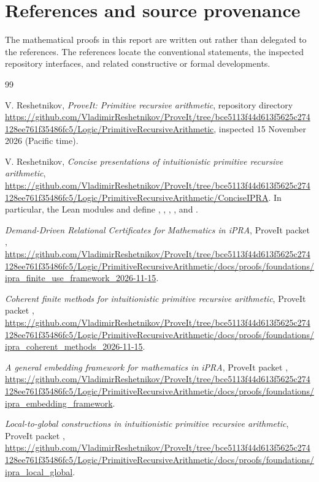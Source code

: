 \section{References and source provenance}

The mathematical proofs in this report are written out rather than delegated to the references.
The references locate the conventional statements, the inspected repository interfaces, and related
constructive or formal developments.

\begin{thebibliography}{99}

V. Reshetnikov,
\emph{ProveIt: Primitive recursive arithmetic},
repository directory \url{https://github.com/VladimirReshetnikov/ProveIt/tree/bce5113f44d613f5625c274128ee761f35486fc5/Logic/PrimitiveRecursiveArithmetic},
inspected 15 November 2026 (Pacific time).

V. Reshetnikov,
\emph{Concise presentations of intuitionistic primitive recursive arithmetic},
\url{https://github.com/VladimirReshetnikov/ProveIt/tree/bce5113f44d613f5625c274128ee761f35486fc5/Logic/PrimitiveRecursiveArithmetic/ConciseIPRA}.
In particular, the Lean modules  and  define
, , , , and .

\emph{Demand-Driven Relational Certificates for Mathematics in iPRA},
ProveIt packet ,
\url{https://github.com/VladimirReshetnikov/ProveIt/tree/bce5113f44d613f5625c274128ee761f35486fc5/Logic/PrimitiveRecursiveArithmetic/docs/proofs/foundations/ipra_finite_use_framework_2026-11-15}.

\emph{Coherent finite methods for intuitionistic primitive recursive arithmetic},
ProveIt packet ,
\url{https://github.com/VladimirReshetnikov/ProveIt/tree/bce5113f44d613f5625c274128ee761f35486fc5/Logic/PrimitiveRecursiveArithmetic/docs/proofs/foundations/ipra_coherent_methods_2026-11-15}.

\emph{A general embedding framework for mathematics in iPRA},
ProveIt packet ,
\url{https://github.com/VladimirReshetnikov/ProveIt/tree/bce5113f44d613f5625c274128ee761f35486fc5/Logic/PrimitiveRecursiveArithmetic/docs/proofs/foundations/ipra_embedding_framework}.

\emph{Local-to-global constructions in intuitionistic primitive recursive arithmetic},
ProveIt packet ,
\url{https://github.com/VladimirReshetnikov/ProveIt/tree/bce5113f44d613f5625c274128ee761f35486fc5/Logic/PrimitiveRecursiveArithmetic/docs/proofs/foundations/ipra_local_global}.


\end{thebibliography}
